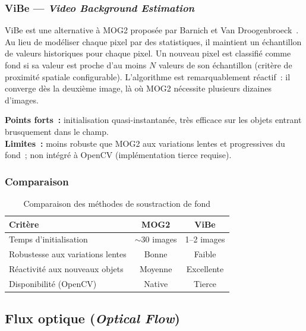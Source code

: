 \subsubsection{ViBe --- \textit{Video Background Estimation}}

ViBe est une alternative à MOG2 proposée par Barnich et Van Droogenbroeck~\cite{barnich2011vibe}. Au lieu de modéliser chaque pixel par des statistiques, il maintient un échantillon de valeurs historiques pour chaque pixel. Un nouveau pixel est classifié comme fond si sa valeur est proche d'au moins $N$ valeurs de son échantillon (critère de proximité spatiale configurable). L'algorithme est remarquablement réactif~: il converge dès la deuxième image, là où MOG2 nécessite plusieurs dizaines d'images.

\medskip
\noindent\textbf{Points forts~:} initialisation quasi-instantanée, très efficace sur les objets entrant brusquement dans le champ.\\
\textbf{Limites~:} moins robuste que MOG2 aux variations lentes et progressives du fond~; non intégré à OpenCV (implémentation tierce requise).

\subsubsection*{Comparaison}

\begin{table}[h]
\centering
\caption{Comparaison des méthodes de soustraction de fond}
\label{tab:bg_subtraction}
\begin{tabular}{lcc}
\toprule
\textbf{Critère} & \textbf{MOG2} & \textbf{ViBe} \\
\midrule
Temps d'initialisation      & $\sim$30 images & 1--2 images \\
Robustesse aux variations lentes & Bonne    & Faible      \\
Réactivité aux nouveaux objets   & Moyenne  & Excellente  \\
Disponibilité (OpenCV)           & Native   & Tierce      \\
\bottomrule
\end{tabular}
\end{table}

\subsection{Flux optique (\textit{Optical Flow})}

